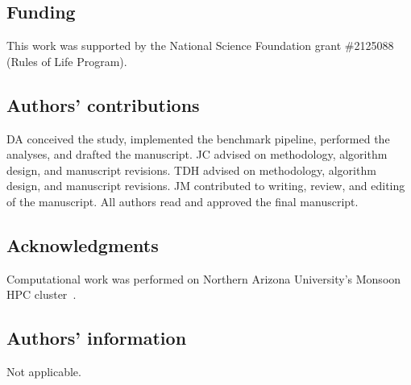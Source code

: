 \documentclass[useAMS,usenatbib,referee]{biom}
\begin{document}
\subsection*{Funding}
This work was supported by the National Science Foundation grant \#2125088 (Rules of Life Program).

\subsection*{Authors' contributions}
DA conceived the study, implemented the benchmark pipeline, performed the analyses, and drafted the manuscript.
JC advised on methodology, algorithm design, and manuscript revisions.
TDH advised on methodology, algorithm design, and manuscript revisions.
JM contributed to writing, review, and editing of the manuscript.
All authors read and approved the final manuscript.

\subsection*{Acknowledgments}
Computational work was performed on Northern Arizona University's Monsoon HPC cluster~\citep{Buechler2025MonsoonIntro}.

\subsection*{Authors' information}
Not applicable.

\backmatter


\label{lastpage}
\end{document}

